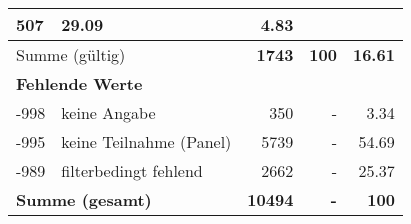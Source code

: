 \begin{longtable}{lXrrr}
       \num{507} &
       \num[round-mode=places,round-precision=2]{29.09} &
         \num[round-mode=places,round-precision=2]{4.83} \\
     \midrule
     \multicolumn{2}{l}{Summe (gültig)} &
       \textbf{\num{1743}} &
     \textbf{\num{100}} &
       \textbf{\num[round-mode=places,round-precision=2]{16.61}} \\
     \multicolumn{5}{l}{\textbf{Fehlende Werte}}\\
       -998 &
       keine Angabe &
         \num{350} &
        - &
         \num[round-mode=places,round-precision=2]{3.34} \\
       -995 &
       keine Teilnahme (Panel) &
         \num{5739} &
        - &
         \num[round-mode=places,round-precision=2]{54.69} \\
       -989 &
       filterbedingt fehlend &
         \num{2662} &
        - &
         \num[round-mode=places,round-precision=2]{25.37} \\
     \midrule
     \multicolumn{2}{l}{\textbf{Summe (gesamt)}} &
          \textbf{\num{10494}} &
        \textbf{-} &
        \textbf{\num{100}} \\
     \bottomrule
     \end{longtable}
     
